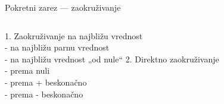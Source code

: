 \begin{frame}[label=06-s015]{Pokretni zarez — zaokruživanje}
\vspace{1.5mm}


\fontsize{10}{12}\selectfont
\begin{columns}[t,onlytextwidth]
1. Zaokruživanje na najbližu vrednost\\\hspace*{5mm}- na najbližu parnu vrednost\\\hspace*{5mm}- na najbližu vrednost „od nule“
2. Direktno zaokruživanje\\\hspace*{5mm}- prema nuli\\\hspace*{5mm}- prema + beskonačno\\\hspace*{5mm}- prema - beskonačno
\end{columns}\par\vspace{4mm}
\centering
\end{frame}
